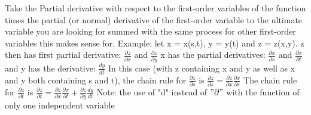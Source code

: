 \documentclass[10pt,landscape]{article}
\begin{document}
\begin{multicols*}{5}
Take the Partial derivative with respect to the first-order variables of the function times the partial (or normal) derivative of the first-order variable to the ultimate variable you are looking for summed with the same process for other first-order variables this makes sense for.\newline
Example:\newline
let x = x(s,t), y = y(t) and z = z(x,y).\newline
z then has first partial derivative:\newline
$ \frac{\partial z}{\partial x} $ and $ \frac{\partial z}{\partial y} $ \newline
x has the partial derivatives:\newline
$ \frac{\partial x}{\partial s} $ and $ \frac{\partial x}{\partial t} $ \newline
and y has the derivative:\newline
$ \frac{dy}{dt} $ \newline
In this case (with z containing x and y as well as x and y both containing s and t), the chain rule for $ \frac{\partial z}{\partial s} $ is $ \frac{\partial z}{\partial s} = \frac{\partial z}{\partial x} \frac{\partial x}{\partial s} $\newline
The chain rule for $ \frac{\partial z}{\partial t} $ is $ \frac{\partial z}{\partial t} = \frac{\partial z}{\partial x} \frac{\partial x}{\partial t} + \frac{\partial z}{\partial y} \frac{dy}{dt}$\newline
Note: the use of "d" instead of $ "\partial" $ with the function of only one independent variable


\end{multicols*}
\end{document}
